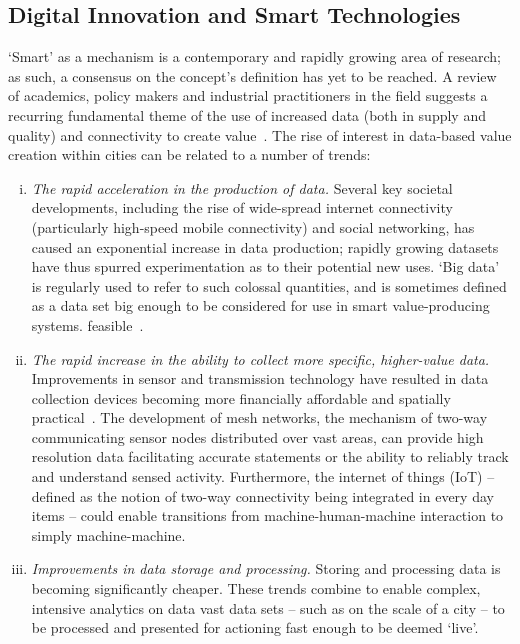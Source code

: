 \documentclass[b5paper,10pt]{article}
\begin{document}
\subsection{Digital Innovation and Smart Technologies}

`Smart' as a mechanism is a contemporary and rapidly growing area of
research; as such, a consensus on the concept's definition has yet to
be reached. A review of academics, policy makers and industrial
practitioners in the field suggests a recurring fundamental theme of
the use of increased data (both in supply and quality) and
connectivity to create
value~\citep{komninos:2002,arup-et-al:2011,harrison+abbottdonnelly:2011,batty-et-al:2012,buscher:2014}. The
rise of interest in data-based value creation within cities can be
related to a number of trends:

\begin{enumerate}[i)]
\item {\emph{The rapid acceleration in the production of data.}}
Several key societal developments, including the rise of wide-spread
internet connectivity (particularly high-speed mobile connectivity)
and social networking, has caused an exponential increase in data
production; rapidly growing datasets have thus spurred experimentation
as to their potential new uses. `Big data' is regularly used to refer
to such colossal quantities, and is sometimes defined as a data set
big enough to be considered for use in smart value-producing
systems. feasible~\citep{hollands:2008,ibmsmartcities:2009,ciscoconcities:2010}.
\item {\emph{The rapid increase in the ability to collect more
specific, higher-value data.}} Improvements in sensor and transmission
technology have resulted in data collection devices becoming more
financially affordable and spatially
practical~\citep{townsend:2013}. The development of mesh networks, the
mechanism of two-way communicating sensor nodes distributed over vast
areas, can provide high resolution data facilitating accurate
statements or the ability to reliably track and understand sensed
activity. Furthermore, the internet of things (IoT) -- defined as the notion
of two-way connectivity being integrated in every day items -- could
enable transitions from machine-human-machine interaction to simply
machine-machine.
\item {\emph{Improvements in data storage and processing.}}  Storing
and processing data is becoming significantly cheaper. These trends
combine to enable complex, intensive analytics on data vast data sets
-- such as on the scale of a city -- to be processed and presented for
actioning fast enough to be deemed `live'.
\end{enumerate}
\end{document}
